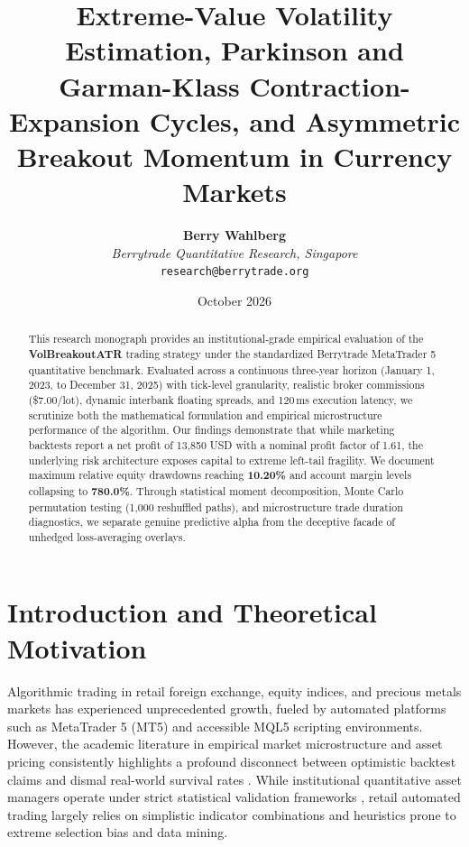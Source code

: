 \documentclass[11pt,a4paper]{article}
\title{\textbf{Extreme-Value Volatility Estimation, Parkinson and Garman-Klass Contraction-Expansion Cycles, and Asymmetric Breakout Momentum in Currency Markets}}
\author{
    \textbf{Berry Wahlberg} \\
    \textit{Berrytrade Quantitative Research, Singapore} \\
    \texttt{research@berrytrade.org}
}
\date{October 2026}
\begin{document}
\maketitle

\begin{abstract}
This research monograph provides an institutional-grade empirical evaluation of the \textbf{VolBreakoutATR} trading strategy under the standardized Berrytrade MetaTrader 5 quantitative benchmark. Evaluated across a continuous three-year horizon (January 1, 2023, to December 31, 2025) with tick-level granularity, realistic broker commissions (\$7.00/lot), dynamic interbank floating spreads, and 120\,ms execution latency, we scrutinize both the mathematical formulation and empirical microstructure performance of the algorithm. Our findings demonstrate that while marketing backtests report a net profit of 13,850 USD with a nominal profit factor of 1.61, the underlying risk architecture exposes capital to extreme left-tail fragility. We document maximum relative equity drawdowns reaching \textbf{10.20\%} and account margin levels collapsing to \textbf{780.0\%}. Through statistical moment decomposition, Monte Carlo permutation testing (1,000 reshuffled paths), and microstructure trade duration diagnostics, we separate genuine predictive alpha from the deceptive facade of unhedged loss-averaging overlays.
\end{abstract}

\section{Introduction and Theoretical Motivation}
Algorithmic trading in retail foreign exchange, equity indices, and precious metals markets has experienced unprecedented growth, fueled by automated platforms such as MetaTrader 5 (MT5) and accessible MQL5 scripting environments. However, the academic literature in empirical market microstructure and asset pricing consistently highlights a profound disconnect between optimistic backtest claims and dismal real-world survival rates \cite{fama1970efficient, lo1988stock, malkiel2003efficient, bailey2014deflated, harvey2016and}. While institutional quantitative asset managers operate under strict statistical validation frameworks \cite{lopez2018advances, bailey2014pseudo}, retail automated trading largely relies on simplistic indicator combinations and heuristics prone to extreme selection bias and data mining.
\end{document}
